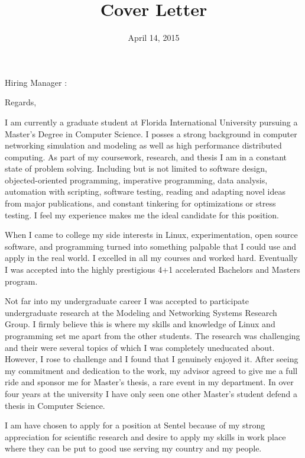 \documentclass[10pt,a4paper,sans]{moderncv}        %
\title{Cover Letter}                               %
\begin{document}
\date{April 14, 2015}
\opening{Hiring Manager :}
\closing{Regards,}
\makelettertitle

I am currently a graduate student at Florida International University pursuing a Master's
Degree in Computer Science. I posses a strong background in computer networking simulation and
modeling as well as high performance distributed computing. As part of my coursework, research,
and thesis I am in a constant state of problem solving. Including but is not limited
to software design, objected-oriented programming, imperative programming, data analysis, automation with
scripting, software testing, reading and adapting novel ideas from major publications, and
constant tinkering for optimizations or stress testing. I feel my
experience makes me the ideal candidate for this position.

When I came to college my side interests in Linux, experimentation, open source software, and programming
turned into something palpable that I could use and apply in the real world. I excelled in all
my courses and worked hard. Eventually I was accepted into the highly prestigious 4+1 accelerated
Bachelors and Masters program. 

Not far into my undergraduate career I was accepted to participate undergraduate research at
the Modeling and Networking Systems Research Group. I firmly believe this is where my skills 
and knowledge of Linux and programming set me apart from the other students. The research was 
challenging and their were several topics of which I was completely uneducated about. However, 
I rose to challenge and I found that I genuinely enjoyed it. After seeing my commitment and 
dedication to the work, my advisor agreed to give me a full ride and sponsor me for Master's 
thesis, a rare event in my department. In over four years at the university I have only seen 
one other Master's student defend a thesis in Computer Science.

I am have chosen to apply for a position at Sentel because of my strong appreciation for scientific
research and desire to apply my skills in work place where they can be put to good use serving
my country and my people.
\end{document}
